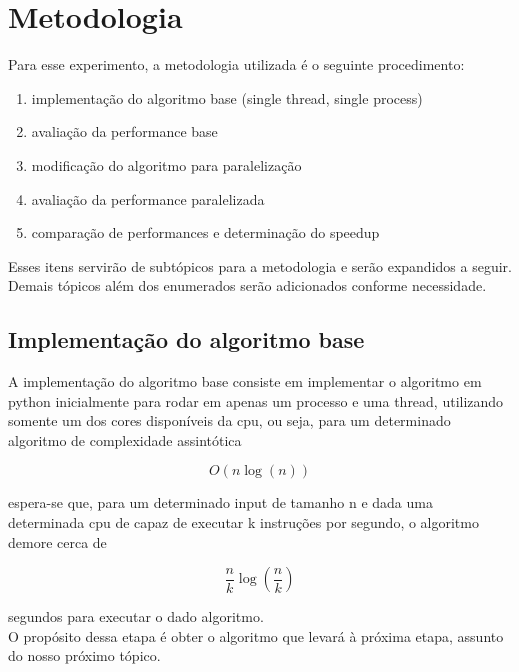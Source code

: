 \documentclass{article}
\begin{document}
\section{Metodologia}
Para esse experimento, a metodologia utilizada é o seguinte procedimento:
\begin{enumerate}
    \item implementação do algoritmo base (single thread, single process)
    \item avaliação da performance base
    \item modificação do algoritmo para paralelização
    \item avaliação da performance paralelizada
    \item comparação de performances e determinação do speedup
\end{enumerate}
Esses itens servirão de subtópicos para a metodologia e serão expandidos a seguir.\\
Demais tópicos além dos enumerados serão adicionados conforme necessidade.\\

\subsection{Implementação do algoritmo base}
    A implementação do algoritmo base consiste em implementar o algoritmo em python inicialmente para rodar em apenas um processo e uma thread, utilizando somente um dos cores disponíveis da cpu, ou seja, para um determinado algoritmo de complexidade assintótica 
        
        \begin{equation}\label{perfbase}
            O(n \log(n))    
        \end{equation}
    
    espera-se que, para um determinado input de tamanho n e dada uma determinada cpu de capaz de executar k instruções por segundo, o algoritmo demore cerca de
        
        \begin{equation}\label{perfseg}
            \frac{n}{k} \log(\frac{n}{k})
        \end{equation}
        
    segundos para executar o dado algoritmo.\\ 
    O propósito dessa etapa é obter o algoritmo que levará à próxima etapa, assunto do nosso próximo tópico.\\
\end{document}
